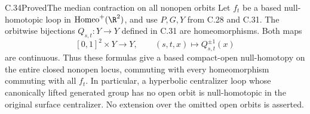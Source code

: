 \begin{claim}{C.34}{Proved}{The median contraction on all nonopen orbits}
Let $f_t$ be a based null-homotopic loop in
$\operatorname{Homeo}^+(\R^2)$, and use $P,G,Y$ from
C.28 and C.31. The orbitwise bijections $Q_{s,t}:Y\to Y$
defined in C.31 are homeomorphisms. Both maps
\[
 [0,1]^2\times Y\longrightarrow Y,\qquad
                  (s,t,x)\longmapsto Q_{s,t}^{\pm1}(x)
                                                        \tag{C.34.1}
\]
are continuous. Thus these formulas give a based
compact-open null-homotopy on the entire closed nonopen
locus, commuting with every homeomorphism commuting
with all $f_t$.
In particular, a hyperbolic centralizer loop whose
canonically lifted generated group has no open orbit
is null-homotopic in the original surface centralizer.
No extension over the omitted open orbits is asserted.
\end{claim}
